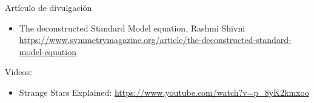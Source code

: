 Artículo de divulgación
\begin{itemize}
\item The deconstructed Standard Model equation, Rashmi Shivni \url{https://www.symmetrymagazine.org/article/the-deconstructed-standard-model-equation}
\end{itemize}

Videos:
\begin{itemize}
\item Strange Stars Explained: \url{https://www.youtube.com/watch?v=p_8yK2kmxoo}
\end{itemize}

%
